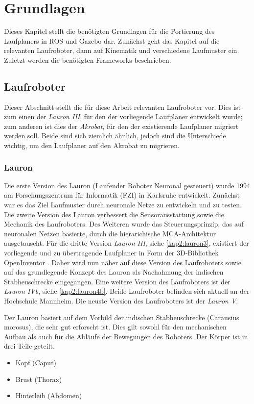 \chapter{Grundlagen}
\label{kap2}

Dieses Kapitel stellt die benötigten Grundlagen für die Portierung des Laufplaners in  \ac{ROS} und Gazebo dar. Zunächst geht das Kapitel auf die relevanten Laufroboter, dann auf Kinematik und verschiedene Laufmuster ein. Zuletzt werden die benötigten Frameworks beschrieben.

\section{Laufroboter}

Dieser Abschnitt stellt die für diese Arbeit relevanten Laufroboter vor. Dies ist zum einen der \emph{Lauron III}, für den der vorliegende Laufplaner entwickelt wurde; zum anderen ist dies der \emph{Akrobat}, für den der existierende Laufplaner migriert werden soll. Beide sind sich ziemlich ähnlich, jedoch sind die Unterschiede wichtig, um den Laufplaner auf den Akrobat zu migrieren. 

\subsection{Lauron}

Die erste Version des Lauron (Laufender Roboter Neuronal gesteuert) wurde 1994 am Forschungszentrum für Informatik (FZI) in Karlsruhe \autocite{fzi} entwickelt. Zunächst war es das Ziel Laufmuster durch neuronale Netze zu entwickeln und zu testen. Die zweite Version des Lauron verbessert die Sensorausstattung sowie die Mechanik des Laufroboters. Des Weiteren wurde das Steuerungsprinzip, das auf neuronalen Netzen basierte, durch die hierarichische MCA-Architektur \autocite{scholl2001modular} ausgetauscht. Für die dritte Version \emph{Lauron III}, siehe \autoref{kap2:lauron3}, existiert der vorliegende und zu übertragende Laufplaner in Form der 3D-Bibliothek OpenInventor \autocite{inventor}. Daher wird nun näher auf diese Version des Laufroboters sowie auf das grundlegende Konzept des Lauron als Nachahmung der indischen Stabheuschrecke eingegangen. Eine weitere Version des Laufroboters ist der \emph{Lauron IVb}, siehe \autoref{kap2:lauron4b}. Beide Laufroboter befinden sich aktuell an der Hochschule Mannheim. Die neuste Version des Laufroboters ist der \emph{Lauron V}.

Der Lauron basiert auf dem Vorbild der indischen Stabheuschrecke (Carausius morosus), die sehr gut erforscht ist. Dies gilt sowohl für den mechanischen Aufbau als auch für die Abläufe der Bewegungen des Roboters. Der Körper ist in drei Teile geteilt.
\begin{itemize}
  \item Kopf (Caput)
  \item Brust (Thorax)
  \item Hinterleib (Abdomen)
\end{itemize}

